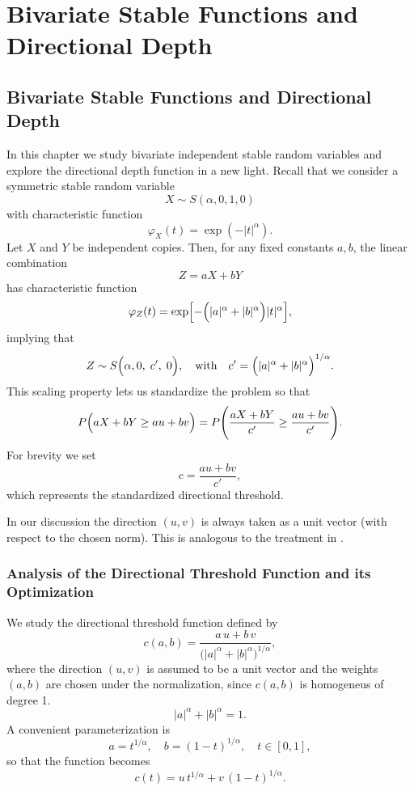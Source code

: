 \graphicspath{{images/}}

\chapter{Bivariate Stable Functions and Directional Depth}

\section{Bivariate Stable Functions and Directional Depth}

In this chapter we study bivariate independent stable random variables and explore the directional depth function in a new light. Recall that we consider a symmetric stable random variable 
\[
X \sim S(\alpha,0,1,0)
\]
with characteristic function 
\[
\varphi_X(t)=\exp(-|t|^\alpha).
\]
Let \(X\) and \(Y\) be independent copies. Then, for any fixed constants \(a,b\), the linear combination
\[
Z = aX + bY
\]
has characteristic function
\[
\varphi_Z(t)=\exp\Bigl[-\Bigl(|a|^\alpha+|b|^\alpha\Bigr)|t|^\alpha\Bigr],
\]
implying that
\[
Z \sim S\Bigl(\alpha,0,\;c',\;0\Bigr),\quad\text{with}\quad c'=\Bigl(|a|^\alpha+|b|^\alpha\Bigr)^{1/\alpha}.
\]
This scaling property lets us standardize the problem so that
\[
P\Bigl(aX+bY\ge au+bv\Bigr)=P\Biggl(\frac{aX+bY}{c'}\ge\frac{au+bv}{c'}\Biggr).
\]
For brevity we set
\[
c=\frac{au+bv}{c'},
\]
which represents the standardized directional threshold.

\medskip
In our discussion the direction \((u,v)\) is always taken as a unit vector (with respect to the chosen norm). This is analogous to the treatment in \cite{rousseeuw1999depth}. 

\subsection{Analysis of the Directional Threshold Function and its Optimization}

We study the directional threshold function defined by
\[
c(a,b) = \frac{a\,u + b\,v}{\bigl(|a|^\alpha + |b|^\alpha\bigr)^{1/\alpha}},
\]
where the direction \((u,v)\) is assumed to be a unit vector and the weights \((a,b)\) are chosen under the normalization, since \(c(a, b)\) is homogeneus of degree 1.
\[
|a|^\alpha + |b|^\alpha = 1.
\]
A convenient parameterization is
\[
a = t^{1/\alpha},\quad b = (1-t)^{1/\alpha},\quad t\in[0,1],
\]
so that the function becomes
\[
c(t) = u\,t^{1/\alpha} + v\,(1-t)^{1/\alpha}.
\]

